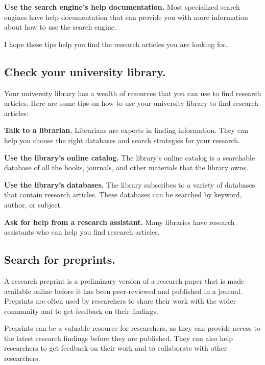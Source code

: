 \documentclass[
  b5paper]{book}
\begin{document}
\textbf{Use the search engine's help documentation.} Most specialized search engines have help documentation that can provide you with more information about how to use the search engine.

I hope these tips help you find the research articles you are looking for.

\hypertarget{check-your-university-library.}{%
\subsection*{Check your university library.}\label{check-your-university-library.}}

Your university library has a wealth of resources that you can use to find research articles. Here are some tips on how to use your university library to find research articles:

\textbf{Talk to a librarian.} Librarians are experts in finding information. They can help you choose the right databases and search strategies for your research.

\textbf{Use the library's online catalog.} The library's online catalog is a searchable database of all the books, journals, and other materials that the library owns.

\textbf{Use the library's databases.} The library subscribes to a variety of databases that contain research articles. These databases can be searched by keyword, author, or subject.

\textbf{Ask for help from a research assistant.} Many libraries have research assistants who can help you find research articles.

\hypertarget{search-for-preprints.}{%
\subsection*{Search for preprints.}\label{search-for-preprints.}}

A research preprint is a preliminary version of a research paper that is made available online before it has been peer-reviewed and published in a journal. Preprints are often used by researchers to share their work with the wider community and to get feedback on their findings.

Preprints can be a valuable resource for researchers, as they can provide access to the latest research findings before they are published. They can also help researchers to get feedback on their work and to collaborate with other researchers.
\end{document}
